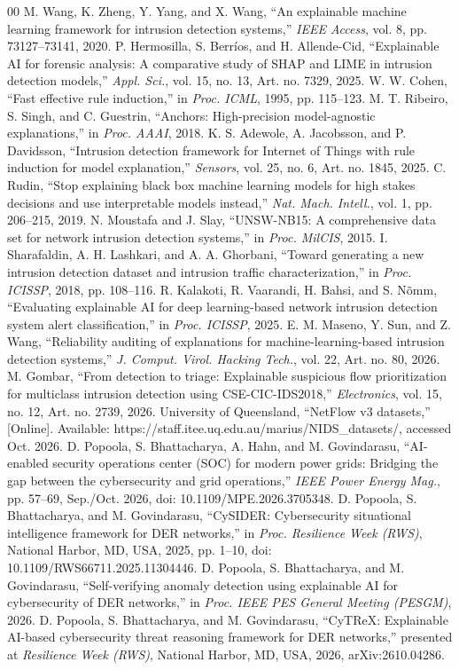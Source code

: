 \documentclass[journal]{IEEEtran}
\begin{document}
\begin{thebibliography}{00}
 M. Wang, K. Zheng, Y. Yang, and X. Wang, ``An explainable machine learning framework for intrusion detection systems,'' \emph{IEEE Access}, vol. 8, pp. 73127--73141, 2020.
 P. Hermosilla, S. Berr\'ios, and H. Allende-Cid, ``Explainable AI for forensic analysis: A comparative study of SHAP and LIME in intrusion detection models,'' \emph{Appl. Sci.}, vol. 15, no. 13, Art. no. 7329, 2025.
 W. W. Cohen, ``Fast effective rule induction,'' in \emph{Proc. ICML}, 1995, pp. 115--123.
 M. T. Ribeiro, S. Singh, and C. Guestrin, ``Anchors: High-precision model-agnostic explanations,'' in \emph{Proc. AAAI}, 2018.
 K. S. Adewole, A. Jacobsson, and P. Davidsson, ``Intrusion detection framework for Internet of Things with rule induction for model explanation,'' \emph{Sensors}, vol. 25, no. 6, Art. no. 1845, 2025.
 C. Rudin, ``Stop explaining black box machine learning models for high stakes decisions and use interpretable models instead,'' \emph{Nat. Mach. Intell.}, vol. 1, pp. 206--215, 2019.
 N. Moustafa and J. Slay, ``UNSW-NB15: A comprehensive data set for network intrusion detection systems,'' in \emph{Proc. MilCIS}, 2015.
 I. Sharafaldin, A. H. Lashkari, and A. A. Ghorbani, ``Toward generating a new intrusion detection dataset and intrusion traffic characterization,'' in \emph{Proc. ICISSP}, 2018, pp. 108--116.
 R. Kalakoti, R. Vaarandi, H. Bahsi, and S. N\~{o}mm, ``Evaluating explainable AI for deep learning-based network intrusion detection system alert classification,'' in \emph{Proc. ICISSP}, 2025.
 E. M. Maseno, Y. Sun, and Z. Wang, ``Reliability auditing of explanations for machine-learning-based intrusion detection systems,'' \emph{J. Comput. Virol. Hacking Tech.}, vol. 22, Art. no. 80, 2026.
 M. Gombar, ``From detection to triage: Explainable suspicious flow prioritization for multiclass intrusion detection using CSE-CIC-IDS2018,'' \emph{Electronics}, vol. 15, no. 12, Art. no. 2739, 2026.
 University of Queensland, ``NetFlow v3 datasets,'' [Online]. Available: https://staff.itee.uq.edu.au/marius/NIDS\_datasets/, accessed Oct. 2026.
 D. Popoola, S. Bhattacharya, A. Hahn, and M. Govindarasu, ``AI-enabled security operations center (SOC) for modern power grids: Bridging the gap between the cybersecurity and grid operations,'' \emph{IEEE Power Energy Mag.}, pp. 57--69, Sep./Oct. 2026, doi: 10.1109/MPE.2026.3705348.
 D. Popoola, S. Bhattacharya, and M. Govindarasu, ``CySIDER: Cybersecurity situational intelligence framework for DER networks,'' in \emph{Proc. Resilience Week (RWS)}, National Harbor, MD, USA, 2025, pp. 1--10, doi: 10.1109/RWS66711.2025.11304446.
 D. Popoola, S. Bhattacharya, and M. Govindarasu, ``Self-verifying anomaly detection using explainable AI for cybersecurity of DER networks,'' in \emph{Proc. IEEE PES General Meeting (PESGM)}, 2026.
 D. Popoola, S. Bhattacharya, and M. Govindarasu, ``CyTReX: Explainable AI-based cybersecurity threat reasoning framework for DER networks,'' presented at \emph{Resilience Week (RWS)}, National Harbor, MD, USA, 2026, arXiv:2610.04286.
\end{thebibliography}
\end{document}
